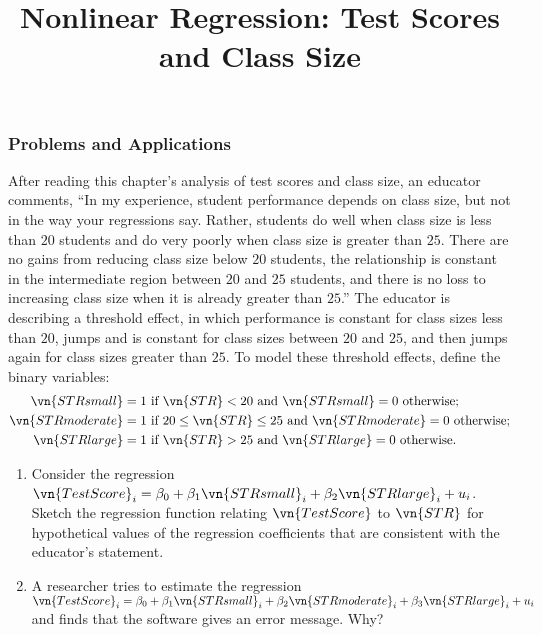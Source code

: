 \title[Nonlinear Regression]{Nonlinear Regression: Test Scores and Class Size}
\date{}







\begin{frame}[shrink=16]
\frametitle{Problems and Applications}
After reading this chapter's analysis of test scores and class size, an educator comments, ``In my experience, student performance depends on class size, but not in the way your regressions say. Rather, students do well when class size is less than $20$ students and do very poorly when class size is greater than $25$. There are no gains from reducing class size below $20$ students, the relationship is constant in the intermediate region between $20$ and $25$ students, and there is no loss to increasing class size when it is already greater than $25$.'' The educator is describing a threshold effect, in which performance is constant for class sizes less than $20$, jumps and is constant for class sizes between $20$ and $25$, and then jumps again for class sizes greater than $25$. To model these threshold effects, define the binary variables:
\begin{align*}
   \vn{STRsmall} & = 1 ~\text{if}~ \vn{STR} < 20 ~\text{and}~ \vn{STRsmall} = 0 ~\text{otherwise};\\
\vn{STRmoderate} & = 1 ~\text{if}~ 20 \leq \vn{STR} \leq 25 ~\text{and}~ \vn{STRmoderate} = 0 ~\text{otherwise};\\
   \vn{STRlarge} & = 1 ~\text{if}~ \vn{STR} > 25 ~\text{and}~ \vn{STRlarge} = 0 ~\text{otherwise}.
\end{align*}\vspace*{-3ex}
\begin{enumerate}
\item Consider the regression $\vn{TestScore}_{i}=\beta_{0}+\beta_{1}\vn{STRsmall}_{i}+\beta_{2}\vn{STRlarge}_{i}+u_{i}$. Sketch the regression function relating $\vn{TestScore}$ to $\vn{STR}$ for hypothetical values of the regression coefficients that are consistent with the educator's statement.
\item A researcher tries to estimate the regression $\vn{TestScore}_{i}=\beta_{0}+\beta_{1}\vn{STRsmall}_{i}+\beta_{2}\vn{STRmoderate}_{i}+\beta_{3}\vn{STRlarge}_{i}+u_{i}$ and finds that the software gives an error message. Why?
\end{enumerate}
\end{frame}


